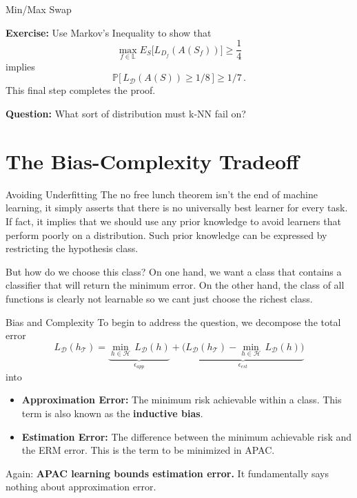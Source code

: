 \documentclass[10pt, table, dvipsnames,handout]{beamer}
\newcommand{\cT}{\ensuremath{\mathcal{T}}}
\newcommand{\cD}{\ensuremath{\mathcal{D}}}
\newcommand{\cH}{\ensuremath{\mathcal{H}}}
\newcommand{\bP}{\ensuremath{\mathbb{P}}}
\begin{document}
\begin{frame}[fragile]{Min/Max Swap}
\begin{minipage}[t][0.4\textheight][t]{\textwidth}
\begin{tikzpicture}[
		sy-/.style = {yshift= -5mm}, 
		sy+/.style = {yshift= 5mm}, 
		]
	\end{tikzpicture}
  \end{minipage}
  \vfill
  \begin{minipage}[t][0.6\textheight][t]{\textwidth}
\textbf{Exercise:} Use Markov's Inequality to show that 
$$
\max_{f\in \mathbb{L}} E_{S}\big[ L_{D_f}(A(S_f)) \big] \geq \frac14
$$
implies
$$
\bP\big[\, L_{\cD}(A(S))\geq 1/8 \,\big]\geq 1/7\,.
$$
This final step completes the proof. \pause

\textbf{Question:} What sort of distribution must k-NN fail on?
\end{minipage}
\end{frame}





\section{The Bias-Complexity Tradeoff}
\begin{frame}[fragile]{Avoiding Underfitting}
The no free lunch theorem isn't the end of machine learning, it simply asserts that there is no universally best learner for every task. If fact, it implies that we should use any prior knowledge to avoid learners that perform poorly on a distribution. Such prior knowledge can be expressed by restricting the hypothesis class. \pause

But how do we choose this class? On one hand, we want a class that contains a classifier that will return the minimum error. On the other hand, the class of all functions is clearly not learnable so we cant just choose the richest class. 
\end{frame}



\begin{frame}[fragile]{Bias and Complexity}
To begin to address the question, we decompose the total error
$$
L_\cD(h_\cT) = \underbrace{\min_{h\in \cH}\,L_\cD(h)}_{\epsilon_{app}}
+
\underbrace{\big(L_\cD(h_\cT) - \min_{h\in \cH}\,L_\cD(h)\big)}_{\epsilon_{est}}
$$\pause
into
\begin{itemize}
\item[] \textbf{Approximation Error:} The minimum risk achievable within a class. This term is also known as the \textbf{inductive bias}.
\item[] \textbf{Estimation Error:} The difference between the minimum achievable risk and the ERM error. This is the term to be minimized in APAC.
\end{itemize}\pause
Again: \textbf{APAC learning bounds estimation error.} It fundamentally says nothing about approximation error. 
\end{frame}
\end{document}
